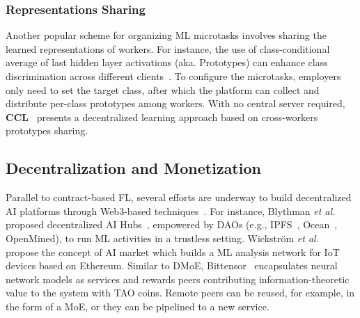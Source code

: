 \subsubsection{Representations Sharing}
Another popular scheme for organizing ML microtasks involves sharing the learned representations of workers. 
For instance, the use of class-conditional average of last hidden layer activations (aka. Prototypes) can enhance class discrimination across different clients~\cite{aketi2024cross, tan2022fedproto, michieli2021prototype, berdoz2022scalable}.
To configure the microtasks, employers only need to set the target class, after which the platform can collect and distribute per-class prototypes among workers.
With no central server required, \textbf{CCL}~\cite{aketi2024cross} presents a decentralized learning approach based on cross-workers prototypes sharing.

\subsection{Decentralization and Monetization}
Parallel to contract-based FL, several efforts are underway to build decentralized AI platforms through Web3-based techniques~\cite{guo2023blockchain}. 
For instance, Blythman \textit{et al.} proposed decentralized AI Hubs~\cite{blythman2022decentralized}, empowered by DAOs (e.g., IPFS~\cite{benet2014ipfs}, Ocean~\cite{mcconaghy2022ocean}, OpenMined), to run ML activities in a trustless setting.
Wickstr{\"o}m \textit{et al.}~\cite{wickstrom2022decentralizing} propose the concept of AI market which builds a ML analysis network for IoT devices based on Ethereum.
Similar to DMoE, Bittensor~\cite{steeves2022incentivizing} encapsulates neural network models as services and rewards peers contributing information-theoretic value to the system with TAO coins. 
Remote peers can be reused, for example, in the form of a MoE, or they can be pipelined to a new service.


